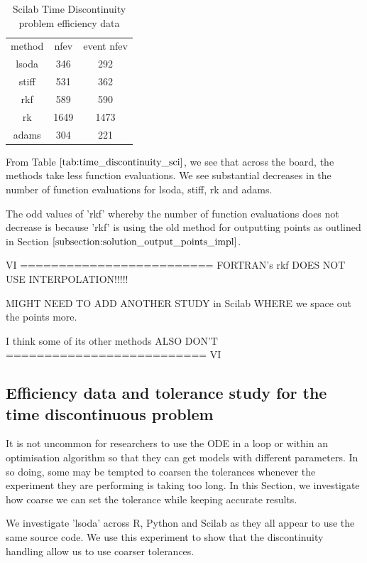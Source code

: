 \begin{table}[h]
\caption {Scilab Time Discontinuity problem efficiency data} 
    \label{tab:time_discontinuity_scilab} 
\begin{center}
\begin{tabular}{ c c c }
 method & nfev & event nfev \\ 
    lsoda & 346  & 292 \\
    stiff & 531  & 362 \\
    rkf   & 589  & 590 \\
    rk    & 1649 & 1473 \\
    adams & 304  & 221  \\
\end{tabular}
\end{center}
\end{table}

From Table $\ref{tab:time_discontinuity_sci}$, we see that across the board, the methods take less function evaluations. We see substantial decreases in the number of function evaluations for lsoda, stiff, rk and adams.

The odd values of 'rkf' whereby the number of function evaluations does not decrease is because 'rkf' is using the old method for outputting points as outlined in Section $\ref{subsection:solution_output_points_impl}$.

VI =========================
FORTRAN's rkf DOES NOT USE INTERPOLATION!!!!!

MIGHT NEED TO ADD ANOTHER STUDY in Scilab WHERE we space out the points more.

I think some of its other methods ALSO DON'T
========================== VI

\subsection{Efficiency data and tolerance study for the time discontinuous problem}
\label{subsection:time_tolerance_study}
It is not uncommon for researchers to use the ODE in a loop or within an optimisation algorithm so that they can get models with different parameters. In so doing, some may be tempted to coarsen the tolerances whenever the experiment they are performing is taking too long. In this Section, we investigate how coarse we can set the tolerance while keeping accurate results. 

We investigate 'lsoda' across R, Python and Scilab as they all appear to use the same source code. We use this experiment to show that the discontinuity handling allow us to use coarser tolerances.

